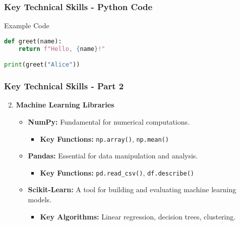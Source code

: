 \documentclass[aspectratio=169]{beamer}
\begin{document}
\begin{frame}[fragile]
    \frametitle{Key Technical Skills - Python Code}
    \begin{block}{Example Code}
    \begin{lstlisting}[language=Python]
def greet(name):
    return f"Hello, {name}!"

print(greet("Alice"))
    \end{lstlisting}
    \end{block}
\end{frame}

\begin{frame}
    \frametitle{Key Technical Skills - Part 2}
    \begin{enumerate}
        \setcounter{enumi}{1}
        \item \textbf{Machine Learning Libraries}
        \begin{itemize}
            \item \textbf{NumPy:} Fundamental for numerical computations.
            \begin{itemize}
                \item \textbf{Key Functions:} \texttt{np.array()}, \texttt{np.mean()}
            \end{itemize}
            \item \textbf{Pandas:} Essential for data manipulation and analysis.
            \begin{itemize}
                \item \textbf{Key Functions:} \texttt{pd.read\_csv()}, \texttt{df.describe()}
            \end{itemize}
            \item \textbf{Scikit-Learn:} A tool for building and evaluating machine learning models.
            \begin{itemize}
                \item \textbf{Key Algorithms:} Linear regression, decision trees, clustering.
            \end{itemize}
        \end{itemize}
    \end{enumerate}
\end{frame}
\end{document}
